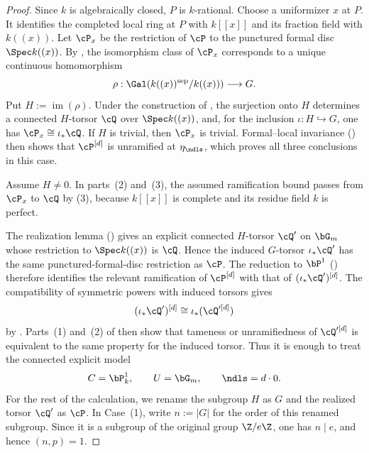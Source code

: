 \begin{proof}
Since $k$ is algebraically closed, $P$ is $k$-rational. Choose a uniformizer
$x$ at $P$. It identifies the completed local ring at $P$ with $k[[x]]$
and its fraction field with $k((x))$. Let $\cP_x$ be the restriction of
$\cP$ to the punctured formal disc $\Spec k((x))$. By
, the isomorphism class of
$\cP_x$ corresponds to a unique continuous homomorphism
\[
    \rho:\Gal(k((x))^{\mathrm{sep}}/k((x)))\longrightarrow G.
\]
Put $H:=\operatorname{im}(\rho)$. Under the construction of
, the surjection onto $H$
determines a connected $H$-torsor $\cQ$ over $\Spec k((x))$, and, for the
inclusion $\iota:H\hookrightarrow G$, one has
$\cP_x\cong\iota_*\cQ$.
If $H$ is trivial, then $\cP_x$ is trivial. Formal--local invariance
() then shows that $\cP^{[d]}$ is
unramified at $\eta_\ndls$, which proves all three conclusions in this case.

Assume $H\neq0$. In parts~(2) and~(3), the assumed ramification bound passes
from $\cP_x$ to $\cQ$ by
(3), because $k[[x]]$ is complete
and its residue field $k$ is perfect.

The realization lemma () gives an explicit
connected $H$-torsor $\cQ'$ on $\bG_m$ whose restriction to
$\Spec k((x))$ is $\cQ$. Hence the induced $G$-torsor $\iota_*\cQ'$ has the
same punctured-formal-disc restriction as $\cP$. The reduction to $\bP^1$
() therefore identifies the relevant ramification
of $\cP^{[d]}$ with that of $(\iota_*\cQ')^{[d]}$. The compatibility of
symmetric powers with induced torsors gives
\[
    (\iota_*\cQ')^{[d]}
       \cong\iota_*(\cQ'^{[d]})
\]
by . Parts~(1) and~(2) of
 then show that tameness or
unramifiedness of $\cQ'^{[d]}$ is equivalent to the same property for the
induced torsor. Thus it is enough to treat the connected explicit model
\[
    C=\bP^1_k,\qquad U=\bG_m,\qquad \ndls=d\cdot0.
\]
For the rest of the calculation, we rename the subgroup $H$ as $G$ and the
realized torsor $\cQ'$ as $\cP$.
In Case~(1), write $n:=|G|$ for the order of this renamed subgroup. Since it
is a subgroup of the original group $\Z/e\Z$, one has $n\mid e$, and hence
$(n,p)=1$.


\end{proof}
